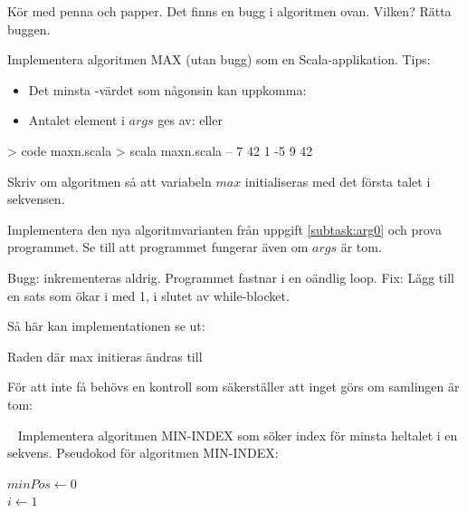 \Subtask Kör med penna och papper. Det finns en bugg i algoritmen ovan. Vilken? Rätta buggen.

\Subtask Implementera algoritmen MAX (utan bugg) som en Scala-applikation. Tips:
\begin{itemize}[noitemsep, nolistsep]
\item Det minsta -värdet som någonsin kan uppkomma: 
\item Antalet element i $args$ ges av:  eller 
\end{itemize}

\begin{REPL}
> code maxn.scala
> scala maxn.scala -- 7 42 1 -5 9
42
\end{REPL}

\Subtask \label{subtask:arg0} Skriv om algoritmen så att variabeln $max$ initialiseras med det första talet i sekvensen.

\Subtask Implementera den nya algoritmvarianten från uppgift \ref{subtask:arg0} och prova programmet. Se till att programmet fungerar även om $args$ är tom.

\SOLUTION


\TaskSolved \what


\SubtaskSolved  Bugg:  inkrementeras aldrig. Programmet fastnar i en oändlig loop. Fix: Lägg till en sats som ökar i med 1, i slutet av while-blocket.

\SubtaskSolved  Så här kan implementationen se ut:

\SubtaskSolved  Raden där max initieras ändras till 

\SubtaskSolved  För att inte få  behövs en kontroll som säkerställer att inget görs om samlingen  är tom:



\QUESTEND






\QUESTBEGIN

\Task \label{task:minindex} \what~  Implementera algoritmen MIN-INDEX som söker index för minsta heltalet i en sekvens. Pseudokod för algoritmen MIN-INDEX:

\begin{algorithm}[H]

 $minPos \leftarrow 0 $\\
 $i \leftarrow 1$ \\
\end{algorithm}

